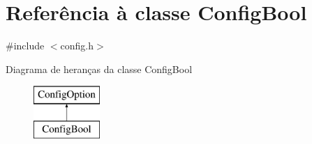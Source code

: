 \hypertarget{class_config_bool}{\section{Referência à classe Config\-Bool}
\label{class_config_bool}
}


{\ttfamily \#include $<$config.\-h$>$}

Diagrama de heranças da classe Config\-Bool\begin{figure}[H]
\begin{center}
\leavevmode
\includegraphics[height=2.000000cm]{class_config_bool}
\end{center}
\end{figure}
